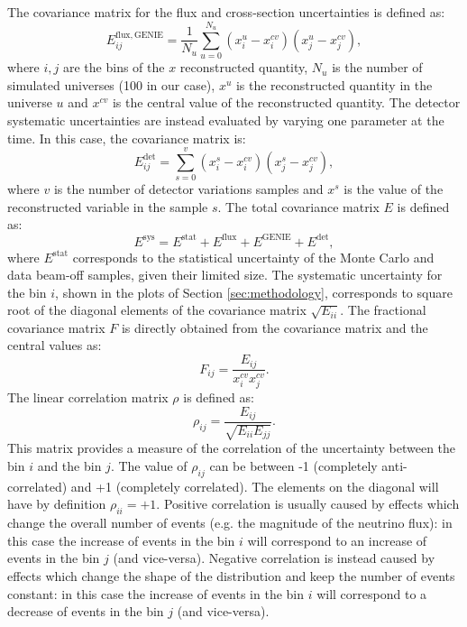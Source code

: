 The covariance matrix for the flux and cross-section uncertainties is defined as:
\begin{equation}
    E_{ij}^{\mathrm{flux, GENIE}} = \frac{1}{N_{u}} \sum^{N_{u}}_{u=0} (x^{u}_{i} - x^{cv}_{i}) (x^{u}_{j} - x^{cv}_{j}),\label{eq:covariance}
\end{equation}
where $i,j$ are the bins of the $x$ reconstructed quantity, $N_{u}$ is the number of simulated universes (100 in our case), $x^{u}$ is the reconstructed quantity in the universe $u$ and $x^{cv}$ is the central value of the reconstructed quantity. 
The detector systematic uncertainties are instead evaluated by varying one parameter at the time. In this case, the covariance matrix is:
\begin{equation}
    E_{ij}^{\mathrm{det}} = \sum^{v}_{s=0} (x^{s}_{i} - x^{cv}_{i}) (x^{s}_{j} - x^{cv}_{j}),\label{eq:cov_det}
\end{equation}
where $v$ is the number of detector variations samples and $x^{s}$ is the value of the reconstructed variable in the sample $s$. The total covariance matrix $E$ is defined as:
\begin{equation}
    E^{\mathrm{sys}} = E^{\mathrm{stat}} + E^{\mathrm{flux}} + E^{\mathrm{GENIE}} + E^{\mathrm{det}},\label{eq:cov_tot}
\end{equation}
where $E^{\mathrm{stat}}$ corresponds to the statistical uncertainty of the Monte Carlo and data beam-off samples, given their limited size. 
The systematic uncertainty for the bin $i$, shown in the plots of Section \ref{sec:methodology}, corresponds to square root of the diagonal elements of the covariance matrix $\sqrt{E_{ii}}$. The fractional covariance matrix $F$ is directly obtained from the covariance matrix and the central values as:
\begin{equation} 
    F_{ij} = \frac{E_{ij}}{x_{i}^{cv} x_{j}^{cv}}.
\end{equation}
The linear correlation matrix $\rho$ is defined as:
\begin{equation}
    \rho_{ij} = \frac{E_{ij}}{\sqrt{E_{ii}E_{jj}}}.
\end{equation}
This matrix provides a measure of the correlation of the uncertainty between the bin $i$ and the bin $j$. The value of $\rho_{ij}$ can be between -1 (completely anti-correlated) and +1 (completely correlated). The elements on the diagonal will have by definition $\rho_{ii}=+1$. 
Positive correlation is usually caused by effects which change the overall number of events (e.g. the magnitude of the neutrino flux): in this case the increase of events in the bin $i$ will correspond to an increase of events in the bin $j$ (and vice-versa). Negative correlation is instead caused by effects which change the shape of the distribution and keep the number of events constant: in this case the increase of events in the bin $i$ will correspond to a decrease of events in the bin $j$ (and vice-versa).

